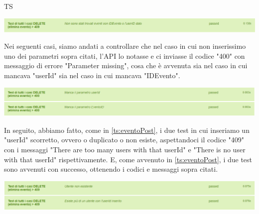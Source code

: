 \begin{listaPersonale}{TS}
                \begin{center}
                        \includegraphics[width=1\textwidth, height=0.04\textheight]{img/png/tests/EventoDelete/200_DeleteEvento.png}
                \end{center}
                Nei seguenti casi, siamo andati a controllare che nel caso in cui non inserissimo uno dei parametri sopra citati, l'API lo notasse e ci inviasse il codice "400" con messaggio di errore "Parameter missing", cosa che è avvenuta sia nel caso in cui mancava "userId" sia nel caso in cui mancava "IDEvento".
                \begin{center}
                        \includegraphics[width=1\textwidth, height=0.08\textheight]{img/png/tests/EventoDelete/400_missingParameter_deleteEvento.png}
                \end{center}
                In seguito, abbiamo fatto, come in \ref{ts:eventoPost}, i due test in cui inseriamo un "userId" scorretto, ovvero o duplicato o non esiste, aspettandoci il codice "409" con i messaggi "There are too many users with that userId" e "There is no user with that userId" rispettivamente. E, come avvenuto in \ref{ts:eventoPost}, i due test sono avvenuti con successo, ottenendo i codici e messaggi sopra citati.
                \begin{center}
                        \includegraphics[width=1\textwidth, height=0.08\textheight]{img/png/tests/EventoDelete/409_userId_DeleteEvento.png}

\end{center}
\end{listaPersonale}
